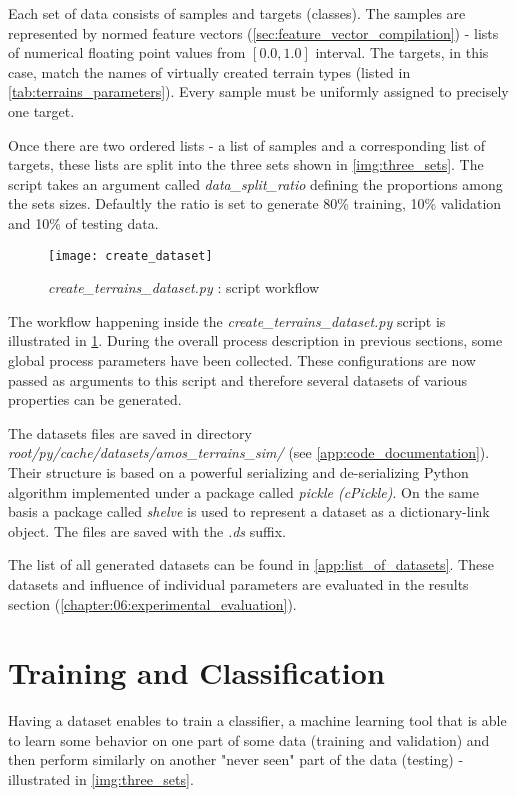 Each set of data consists of samples and targets (classes). The samples are represented by normed feature vectors (\cref{sec:feature_vector_compilation}) - lists of numerical floating point values from $ [0.0, 1.0] $ interval. The targets, in this case, match the names of virtually created terrain types (listed in \cref{tab:terrains_parameters}). Every sample must be uniformly assigned to precisely one target.

Once there are two ordered lists - a list of samples and a corresponding list of targets, these lists are split into the three sets shown in \cref{img:three_sets}. The script takes an argument called \textit{data\_split\_ratio} defining the proportions among the sets sizes. Defaultly the ratio is set to generate 80\% training, 10\% validation and 10\% of testing data.

\begin{figure}[H]
  \centering
  \texttt{[image: create\_dataset]}
  \caption{\textit{create\_terrains\_dataset.py} : script workflow}
  \label{img:create_dataset}
\end{figure}

The workflow happening inside the \textit{create\_terrains\_dataset.py} script is illustrated in \cref{img:create_dataset}. During the overall process description in previous sections, some global process parameters have been collected. These configurations are now passed as arguments to this script and therefore several datasets of various properties can be generated.

The datasets files are saved in directory \textit{root/py/cache/datasets/amos\_terrains\_sim/} (see \ref{app:code_documentation}). Their structure is based on a powerful serializing and de-serializing Python algorithm implemented under a package called \textit{pickle (cPickle)}. On the same basis a package called \textit{shelve} is used to represent a dataset as a dictionary-link object. The files are saved with the \textit{.ds} suffix.

The list of all generated datasets can be found in \cref{app:list_of_datasets}. These datasets and influence of individual parameters are evaluated in the results section (\cref{chapter:06:experimental_evaluation}).

\section{Training and Classification}
Having a dataset enables to train a classifier, a machine learning tool that is able to learn some behavior on one part of some data (training and validation) and then perform similarly on another "never seen" part of the data (testing) - illustrated in \cref{img:three_sets}.

